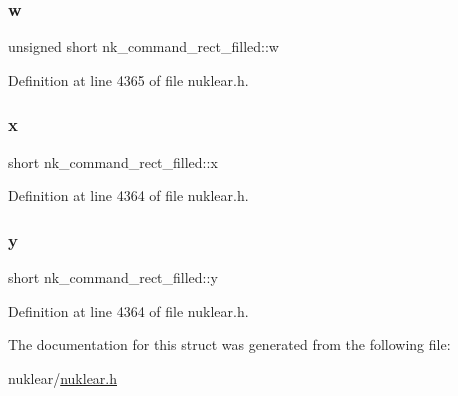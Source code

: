 \mbox{\label{structnk__command__rect__filled_aea649ea0e06951f6b43cf081e3ed46cb}} 
\subsubsection{\texorpdfstring{w}{w}}
{\footnotesize\ttfamily unsigned short nk\+\_\+command\+\_\+rect\+\_\+filled\+::w}



Definition at line 4365 of file nuklear.\+h.

\mbox{\label{structnk__command__rect__filled_a06cec93b095fc457ae510a417c0a8e20}} 
\subsubsection{\texorpdfstring{x}{x}}
{\footnotesize\ttfamily short nk\+\_\+command\+\_\+rect\+\_\+filled\+::x}



Definition at line 4364 of file nuklear.\+h.

\mbox{\label{structnk__command__rect__filled_a445d257d9223e67ebe2efb6dd1e9ddcb}} 
\subsubsection{\texorpdfstring{y}{y}}
{\footnotesize\ttfamily short nk\+\_\+command\+\_\+rect\+\_\+filled\+::y}



Definition at line 4364 of file nuklear.\+h.



The documentation for this struct was generated from the following file\+:\begin{DoxyCompactItemize}
\item 
nuklear/\mbox{\hyperlink{nuklear_8h}{nuklear.\+h}}\end{DoxyCompactItemize}
